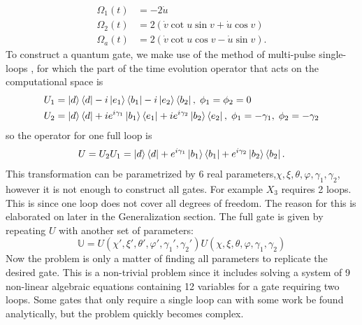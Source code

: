 \begin{equation}
\begin{aligned}
\Omega_1(t) &= -2\dot{u}
\\ 
\Omega_2(t) &= 2\left(\dot{v}\cot u\sin v + \dot{u}\cos v \right)
\\
\Omega_a(t) &= 2\left(\dot{v}\cot u\cos v - \dot{u}\sin v \right).
\end{aligned}
\end{equation}
To construct a quantum gate, we make use of the method of multi-pulse single-loops \cite{sLoop}, for which the part of the time evolution operator that acts on the computational space is
\begin{equation}
\begin{aligned}&
U_1 = \ket{d}\bra{d} -i\ket{e_1}\bra{b_1} -i\ket{e_2}\bra{b_2},\; \phi_1 = \phi_2 = 0
\\&
U_2 = \ket{d}\bra{d} +ie^{i\gamma_1}\ket{b_1}\bra{e_1} +ie^{i\gamma_2}\ket{b_2}\bra{e_2},\; \phi_1 = -\gamma_1,\; \phi_2 = -\gamma_2
\end{aligned}
\end{equation}
so the operator for one full loop is 
\begin{equation}
\label{eq:trit-gate-1-loop}
U = U_2U_1 = \ket{d}\bra{d} + e^{i\gamma_1}\ket{b_1}\bra{b_1} + e^{i\gamma_2}\ket{b_2}\bra{b_2}.
\end{equation}
This transformation can be parametrized by $6$ real parameters,$\chi,\xi,\theta,\varphi,\gamma_1,\gamma_2$, however it is not enough to construct all gates. For example $X_3$ requires 2 loops. This is since one loop does not cover all degrees of freedom. The reason for this is elaborated on later in the Generalization section. The full gate is given by repeating $U$ with another set of parameters:
\begin{equation}
\label{eq:trit-gate-2-loop}
\mathbb{U} = U(\chi',\xi',\theta',\varphi',\gamma_1',\gamma_2') U(\chi,\xi,\theta,\varphi,\gamma_1,\gamma_2)
\end{equation}
Now the problem is only a matter of finding all parameters to replicate the desired gate. This is a non-trivial problem since it includes solving a system of 9 non-linear algebraic equations containing 12 variables for a gate requiring two loops. Some gates that only require a single loop can with some work be found analytically, but the problem quickly becomes complex.

